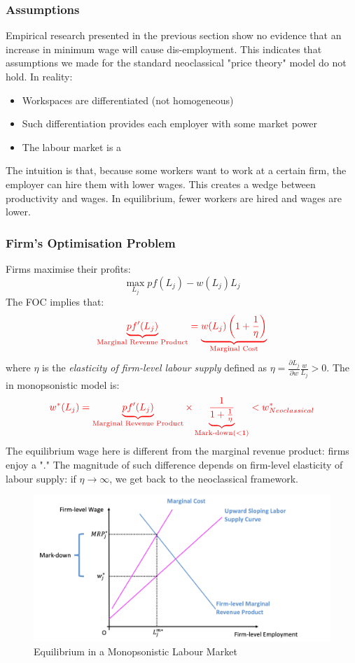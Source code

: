         \subsubsection{Assumptions}
            Empirical research presented in the previous section show no evidence that an increase in minimum wage will cause dis-employment. This indicates that assumptions we made for the standard neoclassical "price theory" model do not hold. In reality:
            \begin{itemize}
                \item Workspaces are differentiated (not homogeneous)
                \item Such differentiation provides each employer with some market power
                \item The labour market is a 
            \end{itemize}
            The intuition is that, because some workers want to work at a certain firm, the employer can hire them with lower wages. This creates a wedge between productivity and wages. In equilibrium, fewer workers are hired and wages are lower.
            
        \subsubsection{Firm's Optimisation Problem}
            Firms maximise their profits:
            $$\max_{L_j} pf(L_j) - w(L_j)L_j$$
            The FOC implies that:
            $$\color{red} \underbrace{pf'(L_j)}_{\text{Marginal\ Revenue\ Product}} = \underbrace{w(L_j)\left(1+\frac{1}{\eta}\right)}_{\text{Marginal\ Cost}}$$
            where $\eta$ is the \emph{elasticity of firm-level labour supply} defined as $\eta = \frac{\partial L_j}{\partial w}\frac{w}{L_j} > 0$.
            The  in monopsonistic model is:
            $$\color{red} w^*(L_j)= \underbrace{pf'(L_j)}_{\text{Marginal\ Revenue\ Product}} \times \underbrace{\frac{1}{1+\frac{1}{\eta}}}_{\text{Mark-down}(<1)} < w^*_{Neoclassical}$$
            The equilibrium wage here is different from the marginal revenue product: firms enjoy a "." The magnitude of such difference depends on firm-level elasticity of labour supply: if $\eta \rightarrow \infty$, we get back to the neoclassical framework.
            \begin{figure}[H]
                \centering
                \includegraphics[width=5in]{images/ch2/Monop_LM_1.png}
                \caption{Equilibrium in a Monopsonistic Labour Market}
            \end{figure}
            
